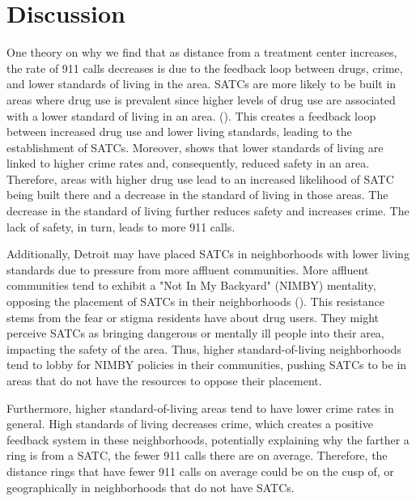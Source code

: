 \documentclass[12pt]{article}
\begin{document}
\break
\section{Discussion}
\label{sec:discussion}

One theory on why we find that as distance from a treatment center increases, the rate of 911 calls decreases is due to the feedback loop between drugs, crime, and lower standards of living in the area. SATCs are more likely to be built in areas where drug use is prevalent since higher levels of drug use are associated with a lower standard of living in an area. (\cite{drugs_and_crime}). This creates a feedback loop between increased drug use and lower living standards, leading to the establishment of SATCs. Moreover, \cite{drugs_and_crime} shows that lower standards of living are linked to higher crime rates and, consequently, reduced safety in an area. Therefore, areas with higher drug use lead to an increased likelihood of SATC being built there and a decrease in the standard of living in those areas. The decrease in the standard of living further reduces safety and increases crime. The lack of safety, in turn, leads to more 911 calls.  

Additionally, Detroit may have placed SATCs in neighborhoods with lower living standards due to pressure from more affluent communities. More affluent communities tend to exhibit a "Not In My Backyard" (NIMBY) mentality, opposing the placement of SATCs in their neighborhoods (\citealp{NIMBY}). This resistance stems from the fear or stigma residents have about drug users. They might perceive SATCs as bringing dangerous or mentally ill people into their area, impacting the safety of the area. Thus, higher standard-of-living neighborhoods tend to lobby for NIMBY policies in their communities, pushing SATCs to be in areas that do not have the resources to oppose their placement.

Furthermore, higher standard-of-living areas tend to have lower crime rates in general. High standards of living decreases crime, which creates a positive feedback system in these neighborhoods, potentially explaining why the farther a ring is from a SATC, the fewer 911 calls there are on average. Therefore, the distance rings that have fewer 911 calls on average could be on the cusp of, or geographically in neighborhoods that do not have SATCs. 
    
\end{document}
